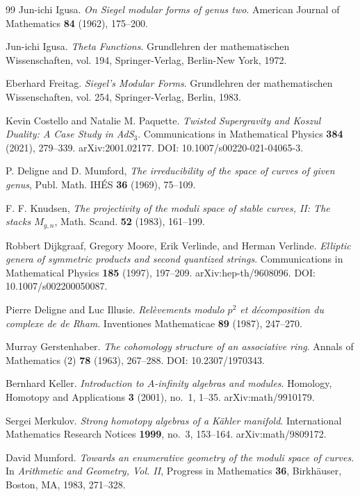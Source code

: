 \begin{thebibliography}{99}
Jun-ichi Igusa.
\textit{On Siegel modular forms of genus two}.
American Journal of Mathematics \textbf{84} (1962), 175--200.

Jun-ichi Igusa.
\textit{Theta Functions}.
Grundlehren der mathematischen Wissenschaften, vol. 194, Springer-Verlag, Berlin-New York, 1972.

Eberhard Freitag.
\textit{Siegel's Modular Forms}.
Grundlehren der mathematischen Wissenschaften, vol. 254, Springer-Verlag, Berlin, 1983.


Kevin Costello and Natalie M. Paquette.
\textit{Twisted Supergravity and Koszul Duality: A Case Study in AdS$_3$}.
Communications in Mathematical Physics \textbf{384} (2021), 279--339.
arXiv:2001.02177. DOI: 10.1007/s00220-021-04065-3.

 P. Deligne and D. Mumford, \emph{The irreducibility of the space of curves of given genus}, Publ. Math. IH\'ES \textbf{36} (1969), 75--109.

 F. F. Knudsen, \emph{The projectivity of the moduli space of stable curves, II: The stacks $M_{g,n}$}, Math. Scand. \textbf{52} (1983), 161--199.

Robbert Dijkgraaf, Gregory Moore, Erik Verlinde, and Herman Verlinde.
\textit{Elliptic genera of symmetric products and second quantized strings}.
Communications in Mathematical Physics \textbf{185} (1997), 197--209.
arXiv:hep-th/9608096. DOI: 10.1007/s002200050087.

Pierre Deligne and Luc Illusie.
\textit{Relèvements modulo $p^2$ et décomposition du complexe de de Rham}.
Inventiones Mathematicae \textbf{89} (1987), 247--270.

Murray Gerstenhaber.
\textit{The cohomology structure of an associative ring}.
Annals of Mathematics (2) \textbf{78} (1963), 267--288.
DOI: 10.2307/1970343.

Bernhard Keller.
\textit{Introduction to $A$-infinity algebras and modules}.
Homology, Homotopy and Applications \textbf{3} (2001), no.~1, 1--35.
arXiv:math/9910179.

Sergei Merkulov.
\textit{Strong homotopy algebras of a K\"ahler manifold}.
International Mathematics Research Notices \textbf{1999}, no.~3, 153--164.
arXiv:math/9809172.

David Mumford.
\textit{Towards an enumerative geometry of the moduli space of curves}.
In \textit{Arithmetic and Geometry, Vol. II}, Progress in Mathematics \textbf{36},
Birkhäuser, Boston, MA, 1983, 271--328.


\end{thebibliography}
